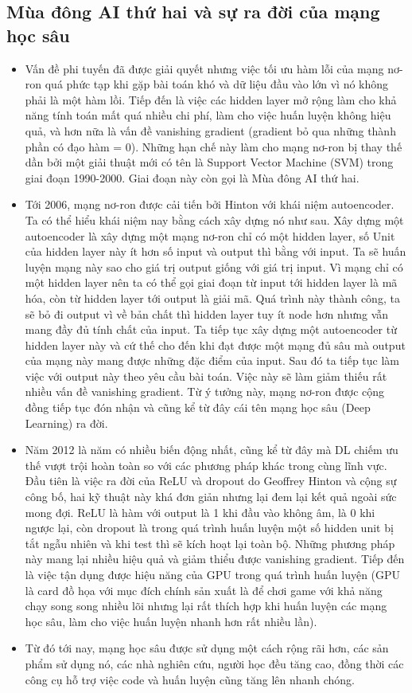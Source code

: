 \subsection{Mùa đông AI thứ hai và sự ra đời của mạng học sâu}
\begin{itemize}
\item Vấn đề phi tuyến đã được giải quyết nhưng việc tối ưu hàm lỗi của mạng nơ-ron quá phức tạp khi gặp bài toán khó và dữ liệu đầu vào lớn vì nó không phải là một hàm lồi. Tiếp đến là việc các hidden layer mở rộng làm cho khả năng tính toán mất quá nhiều chi phí, làm cho việc huấn luyện không hiệu quả, và hơn nữa là vấn đề vanishing gradient (gradient bỏ qua những thành phần có đạo hàm = 0). Những hạn chế này làm cho mạng nơ-ron bị thay thế dần bởi một giải thuật mới có tên là Support Vector Machine (SVM) trong giai đoạn 1990-2000. Giai đoạn này còn gọi là Mùa đông AI thứ hai.
\item Tới 2006, mạng nơ-ron được cải tiến bởi Hinton với khái niệm autoencoder. Ta có thể hiểu khái niệm nay bằng cách xây dựng nó như sau. Xây dựng một autoencoder là xây dựng một mạng nơ-ron chỉ có một hidden layer, số Unit của hidden layer này ít hơn số input và output thì bằng với input. Ta sẽ huấn luyện mạng này sao cho giá trị output giống với giá trị input. Vì mạng chỉ có một hidden layer nên ta có thể gọi giai đoạn từ input tới hidden layer là mã hóa, còn từ hidden layer tới output là giải mã. Quá trình này thành công, ta sẽ bỏ đi output vì về bản chất thì hidden layer tuy ít node hơn nhưng vẫn mang đầy đủ tính chất của input. Ta tiếp tục xây dựng một autoencoder từ hidden layer này và cứ thế cho đến khi đạt được một mạng đủ sâu mà output của mạng này mang được những đặc điểm của input. Sau đó ta tiếp tục làm việc với output này theo yêu cầu bài toán. Việc này sẽ làm giảm thiếu rất nhiều vấn đề vanishing gradient. Từ ý tưởng này, mạng nơ-ron được cộng đồng tiếp tục đón nhận và cũng kể từ đây cái tên mạng học sâu (Deep Learning) ra đời.
\item Năm 2012 là năm có nhiều biến động nhất, cũng kể từ đây mà DL chiếm ưu thế vượt trội hoàn toàn so với các phương pháp khác trong cùng lĩnh vực. Đầu tiên là việc ra đời của ReLU và dropout do Geoffrey Hinton và cộng sự công bố, hai kỹ thuật này khá đơn giản nhưng lại đem lại kết quả ngoài sức mong đợi. ReLU là hàm với output là 1 khi đầu vào không âm, là 0 khi ngược lại, còn dropout là trong quá trình huấn luyện một số hidden unit bị tắt ngẫu nhiên và khi test thì sẽ kích hoạt lại toàn bộ. Những phương pháp này mang lại nhiều hiệu quả và giảm thiểu được vanishing gradient. Tiếp đến là việc tận dụng được hiệu năng của GPU trong quá trình huấn luyện (GPU là card đồ họa với mục đích chính sản xuất là để chơi game với khả năng chạy song song nhiều lõi nhưng lại rất thích hợp khi huấn luyện các mạng học sâu, làm cho việc huấn luyện nhanh hơn rất nhiều lần).
\item Từ đó tới nay, mạng học sâu được sử dụng một cách rộng rãi hơn, các sản phẩm sử dụng nó, các nhà nghiên cứu, người học đều tăng cao, đồng thời các công cụ hỗ trợ việc code và huấn luyện cũng tăng lên nhanh chóng.
\end{itemize}

